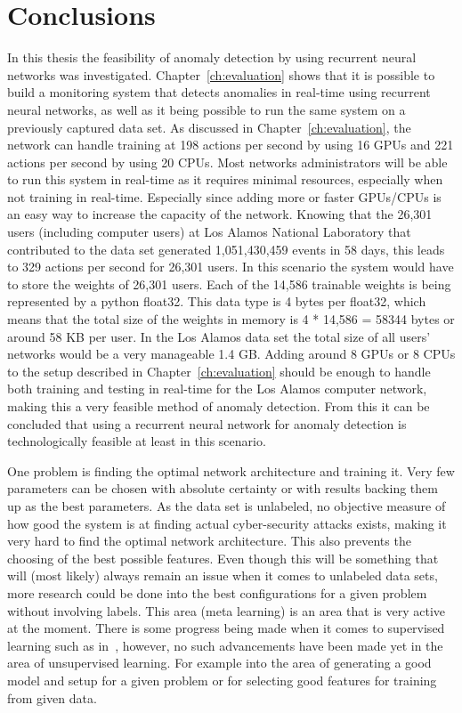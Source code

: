 \chapter{Conclusions}\label{ch:conclusions}

In this thesis the feasibility of anomaly detection by using recurrent neural networks was investigated. Chapter~\ref{ch:evaluation} shows that it is possible to build a monitoring system that detects anomalies in real-time using recurrent neural networks, as well as it being possible to run the same system on a previously captured data set. As discussed in Chapter~\ref{ch:evaluation}, the network can handle training at 198 actions per second by using 16 GPUs and 221 actions per second by using 20 CPUs. Most networks administrators will be able to run this system in real-time as it requires minimal resources, especially when not training in real-time. Especially since adding more or faster GPUs/CPUs is an easy way to increase the capacity of the network. Knowing that the 26,301 users (including computer users) at Los Alamos National Laboratory that contributed to the data set generated 1,051,430,459 events in 58 days, this leads to 329 actions per second for 26,301 users. In this scenario the system would have to store the weights of 26,301 users. Each of the 14,586 trainable weights is being represented by a python float32. This data type is 4 bytes per float32, which means that the total size of the weights in memory is 4 * 14,586 = 58344 bytes or around 58 KB per user. In the Los Alamos data set the total size of all users' networks would be a very manageable 1.4 GB. Adding around 8 GPUs or 8 CPUs to the setup described in Chapter~\ref{ch:evaluation} should be enough to handle both training and testing in real-time for the Los Alamos computer network, making this a very feasible method of anomaly detection. From this it can be concluded that using a recurrent neural network for anomaly detection is technologically feasible at least in this scenario. 

One problem is finding the optimal network architecture and training it. Very few parameters can be chosen with absolute certainty or with results backing them up as the best parameters. As the data set is unlabeled, no objective measure of how good the system is at finding actual cyber-security attacks exists, making it very hard to find the optimal network architecture. This also prevents the choosing of the best possible features. Even though this will be something that will (most likely) always remain an issue when it comes to unlabeled data sets, more research could be done into the best configurations for a given problem without involving labels. This area (meta learning) is an area that is very active at the moment. There is some progress being made when it comes to supervised learning such as in~\cite{zoph2016neural}, however, no such advancements have been made yet in the area of unsupervised learning. For example into the area of generating a good model and setup for a given problem or for selecting good features for training from given data.

